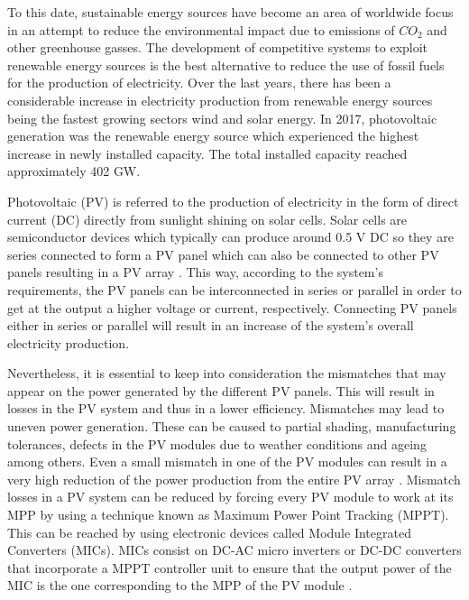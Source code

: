 To this date, sustainable energy sources have become an area of worldwide focus in an attempt to reduce the environmental impact due to emissions of $CO_{2}$ and other greenhouse gasses. The development of competitive systems to exploit renewable energy sources is the best alternative to reduce the use of fossil fuels for the production of electricity. Over the last years, there has been a considerable increase in electricity production from renewable energy sources being the fastest growing sectors wind and solar energy. In 2017, photovoltaic generation was the renewable energy source which experienced the highest increase in newly installed capacity. The total installed capacity reached approximately 402 GW\cite{global}. %

Photovoltaic (PV) is referred to the production of electricity in the form of direct current (DC) directly from sunlight shining on solar cells. Solar cells are semiconductor devices which typically can produce around 0.5 V DC so they are series connected to form a PV panel which can also be connected to other PV panels resulting in a PV array \cite{handbook}. This way, according to the system's requirements, the PV panels can be interconnected in series or parallel in order to get at the output a higher voltage or current, respectively. Connecting PV panels either in series or parallel will result in an increase of the system's overall electricity production. %

Nevertheless, it is essential to keep into consideration the mismatches that may appear on the power generated by the different PV panels. This will result in losses in the PV system and thus in a lower efficiency. Mismatches may lead to uneven power generation. These can be caused to partial shading, manufacturing tolerances, defects in the PV modules due to weather conditions and ageing among others. Even a small mismatch in one of the PV modules can result in a very high reduction of the power production from the entire PV array \cite{MPPmismatch}. Mismatch losses in a PV system can be reduced by forcing every PV module to work at its MPP by using a technique known as Maximum Power Point Tracking (MPPT). This can be reached by using electronic devices called Module Integrated Converters (MICs). MICs consist on DC-AC micro inverters or DC-DC converters that incorporate a MPPT controller unit to ensure that the output power of the MIC is the one corresponding to the MPP of the PV module \cite{MPPmismatch}.%